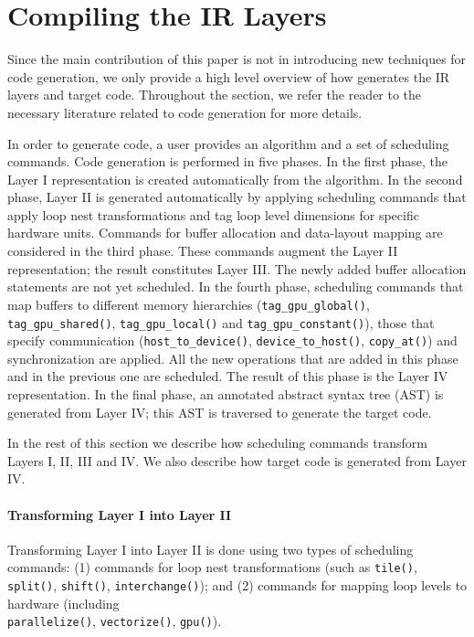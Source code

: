 \vspace{-0.25cm}
\section{Compiling the \framework{} IR Layers}

Since the main contribution of this paper is not in introducing new techniques for code generation, we only provide a high level overview of how \framework{} generates the IR layers and target code.  Throughout the section, we refer the reader to the necessary literature related to code generation for more details.

In order to generate code, a \framework{} user provides an algorithm and a set of scheduling commands.  Code generation is performed in five phases.  In the first phase, the Layer I representation is created automatically from the algorithm.
In the second phase, Layer II is generated automatically by applying scheduling commands that apply loop nest transformations and tag loop level dimensions for specific hardware units. 
Commands for buffer allocation and data-layout mapping are considered in the third phase.  These commands augment the Layer II representation; the result constitutes Layer III.  The newly added buffer allocation statements are not yet scheduled.  In the fourth phase, scheduling commands that map buffers to different memory hierarchies (\texttt{tag\_gpu\_global()}, \texttt{tag\_gpu\_shared()}, \texttt{tag\_gpu\_local()} and \texttt{tag\_gpu\_constant()}), those that specify communication (\texttt{host\_to\_device()}, \texttt{device\_to\_host()}, \texttt{copy\_at()}) and synchronization are applied.  All the new operations that are added in this phase and in the previous one are scheduled.  The result of this phase is the Layer IV representation.  In the final phase, an annotated abstract syntax tree (AST) is generated from Layer IV; this AST is traversed to generate the target code.



In the rest of this section we describe how scheduling commands transform Layers I, II, III and IV.   We also describe how target code is generated from Layer IV.

\vspace{-0.25cm}
\paragraph{Transforming Layer I into Layer II}
Transforming Layer I into Layer II is done using two types of scheduling commands: (1) commands for loop nest transformations (such as \texttt{tile()}, \texttt{split()}, \texttt{shift()}, \texttt{interchange()}); and (2) commands for mapping loop levels to hardware (including\\ \texttt{parallelize()}, \texttt{vectorize()}, \texttt{gpu()}).

